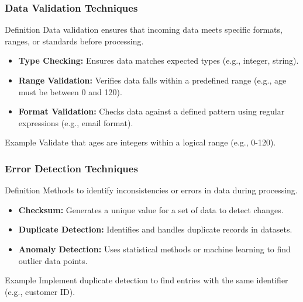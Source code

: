 \documentclass{beamer}
\begin{document}
\begin{frame}[fragile]
    \frametitle{Data Validation Techniques}
    \begin{block}{Definition}
        Data validation ensures that incoming data meets specific formats, ranges, or standards before processing.
    \end{block}
    \begin{itemize}
        \item \textbf{Type Checking:} Ensures data matches expected types (e.g., integer, string).
        \item \textbf{Range Validation:} Verifies data falls within a predefined range (e.g., age must be between 0 and 120).
        \item \textbf{Format Validation:} Checks data against a defined pattern using regular expressions (e.g., email format).
    \end{itemize}
    \begin{block}{Example}
        Validate that ages are integers within a logical range (e.g., 0-120).
    \end{block}
\end{frame}

\begin{frame}[fragile]
    \frametitle{Error Detection Techniques}
    \begin{block}{Definition}
        Methods to identify inconsistencies or errors in data during processing.
    \end{block}
    \begin{itemize}
        \item \textbf{Checksum:} Generates a unique value for a set of data to detect changes.
        \item \textbf{Duplicate Detection:} Identifies and handles duplicate records in datasets.
        \item \textbf{Anomaly Detection:} Uses statistical methods or machine learning to find outlier data points.
    \end{itemize}
    \begin{block}{Example}
        Implement duplicate detection to find entries with the same identifier (e.g., customer ID).
    \end{block}
\end{frame}
\end{document}

